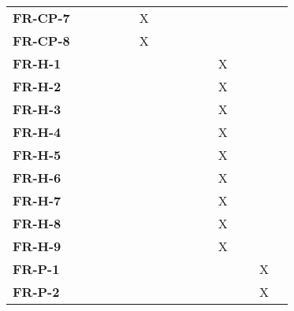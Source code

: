 \documentclass[12pt, titlepage]{article}
\begin{document}
\begin{table}[H]
\begin{adjustbox}{max width=0.7\paperwidth}
\begin{tabular}{l|ccccccccccc}
        \textbf{FR-CP-7}   & ~ & ~ & ~ & X & ~ & ~ & ~ & ~ & ~ & ~\\
        \textbf{FR-CP-8}   & ~ & ~ & ~ & X & ~ & ~ & ~ & ~ & ~ & ~\\
        \textbf{FR-H-1}    & ~ & ~ & ~ & ~ & ~ & ~ & ~ & X & ~ & ~\\
        \textbf{FR-H-2}    & ~ & ~ & ~ & ~ & ~ & ~ & ~ & X & ~ & ~\\
        \textbf{FR-H-3}    & ~ & ~ & ~ & ~ & ~ & ~ & ~ & X & ~ & ~\\
        \textbf{FR-H-4}    & ~ & ~ & ~ & ~ & ~ & ~ & ~ & X & ~ & ~\\
        \textbf{FR-H-5}    & ~ & ~ & ~ & ~ & ~ & ~ & ~ & X & ~ & ~\\
        \textbf{FR-H-6}    & ~ & ~ & ~ & ~ & ~ & ~ & ~ & X & ~ & ~\\
        \textbf{FR-H-7}    & ~ & ~ & ~ & ~ & ~ & ~ & ~ & X & ~ & ~\\
        \textbf{FR-H-8}    & ~ & ~ & ~ & ~ & ~ & ~ & ~ & X & ~ & ~\\
        \textbf{FR-H-9}    & ~ & ~ & ~ & ~ & ~ & ~ & ~ & X & ~ & ~\\
        \textbf{FR-P-1}    & ~ & ~ & ~ & ~ & ~ & ~ & ~ & ~ & ~ & X\\
        \textbf{FR-P-2}    & ~ & ~ & ~ & ~ & ~ & ~ & ~ & ~ & ~ & X\\
    \end{tabular}
    \end{adjustbox}
    \label{Traceability Matrix: Functional Requirement}
\end{table}
\end{document}
